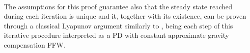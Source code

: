 ~
\\
The assumptions for this proof guarantee also that the steady state reached during each iteration is unique \cite{deluca93} and it, together with its existence, can be proven through a classical Lyapunov argument similarly to \cite{simplepd, pdstable}, being each step of this iterative procedure interpreted as a PD with constant approximate gravity compensation FFW.


